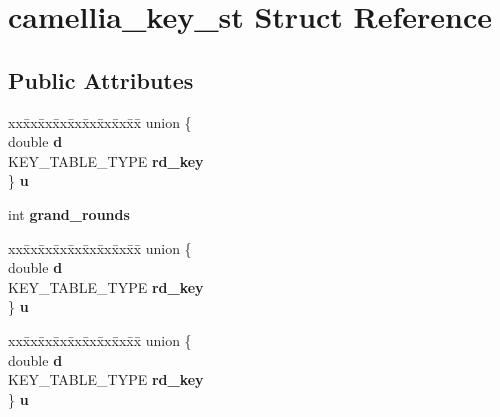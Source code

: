 \hypertarget{structcamellia__key__st}{}\section{camellia\+\_\+key\+\_\+st Struct Reference}
\label{structcamellia__key__st}
\subsection*{Public Attributes}
\begin{DoxyCompactItemize}
\item 
\mbox{\label{structcamellia__key__st_abee41acf2f1a4d9ebe01b429606d785b}} 
\begin{tabbing}
xx\=xx\=xx\=xx\=xx\=xx\=xx\=xx\=xx\=\kill
union \{\\
\>double {\bfseries d}\\
\>KEY\_TABLE\_TYPE {\bfseries rd\_key}\\
\} {\bfseries u}\\

\end{tabbing}\item 
\mbox{\label{structcamellia__key__st_ae0eb815e40c45d92126984b6645a7d96}} 
int {\bfseries grand\+\_\+rounds}
\item 
\mbox{\label{structcamellia__key__st_a5c4b82e1ca3eae11cfef89e9b5877535}} 
\begin{tabbing}
xx\=xx\=xx\=xx\=xx\=xx\=xx\=xx\=xx\=\kill
union \{\\
\>double {\bfseries d}\\
\>KEY\_TABLE\_TYPE {\bfseries rd\_key}\\
\} {\bfseries u}\\

\end{tabbing}\item 
\mbox{\label{structcamellia__key__st_aafd4533fcdccb0b2a32e3838372b530d}} 
\begin{tabbing}
xx\=xx\=xx\=xx\=xx\=xx\=xx\=xx\=xx\=\kill
union \{\\
\>double {\bfseries d}\\
\>KEY\_TABLE\_TYPE {\bfseries rd\_key}\\
\} {\bfseries u}\\


\end{tabbing}
\end{DoxyCompactItemize}
